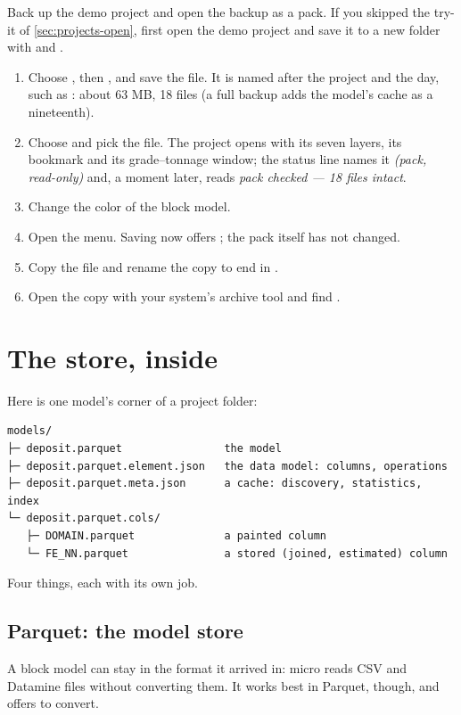 \begin{tryit}
Back up the demo project and open the backup as a pack. If you skipped the try-it of \cref{sec:projects-open}, first open the demo project and save it to a new folder with  and .
\begin{enumerate}
\item Choose , then , and save the file. It is named after the project and the day, such as : about 63 MB, 18 files (a full backup adds the model's cache as a nineteenth).
\item Choose  and pick the file. The project opens with its seven layers, its bookmark and its grade–tonnage window; the status line names it \emph{(pack, read-only)} and, a moment later, reads \emph{pack checked — 18 files intact}.
\item Change the color of the block model.
\item Open the  menu. Saving now offers ; the pack itself has not changed.
\item Copy the file and rename the copy to end in .
\item Open the copy with your system's archive tool and find .
\end{enumerate}
\end{tryit}

\section{The store, inside}\label{sec:store-inside}
Here is one model's corner of a project folder:

\begin{lstlisting}
models/
├─ deposit.parquet                the model
├─ deposit.parquet.element.json   the data model: columns, operations
├─ deposit.parquet.meta.json      a cache: discovery, statistics, index
└─ deposit.parquet.cols/
   ├─ DOMAIN.parquet              a painted column
   └─ FE_NN.parquet               a stored (joined, estimated) column
\end{lstlisting}

Four things, each with its own job.

\subsection{Parquet: the model store}\label{sec:store-parquet}
A block model can stay in the format it arrived in: micro reads CSV and Datamine files without converting them. It works best in Parquet, though, and offers to convert.


